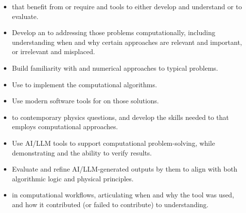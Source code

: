 \documentclass[12pt]{article}
\begin{document}
  \begin{itemize}
    \item {} that benefit from or require  and tools to either develop and understand or to evaluate. 
    \item Develop an  to addressing those problems computationally, including understanding when and why certain approaches are relevant and important, or irrelevant and misplaced.
    \item Build familiarity with  and numerical approaches to typical problems.
    \item Use  to implement the computational algorithms. 
    \item Use modern software tools for  on those solutions.
    \item {} to contemporary physics questions, and develop the skills needed to  that employs computational approaches.
    \item Use AI/LLM tools  to support computational problem-solving, while demonstrating  and the ability to verify results.
    \item Evaluate and refine AI/LLM-generated outputs by  them to align with both algorithmic logic and physical principles.
    \item {} in computational workflows, articulating when and why the tool was used, and how it contributed (or failed to contribute) to understanding.
  \end{itemize}
\end{document}
